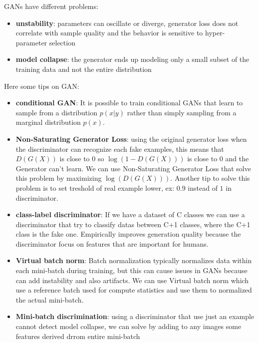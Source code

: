 GANs have different problems:
\begin{itemize}
    \item \textbf{unstability}: parameters can oscillate or diverge, generator
    loss does not correlate with sample quality and the behavior is sensitive to 
    hyper-parameter selection
    \item \textbf{model collapse}: the generator ends up modeling only a small
    subset of the training data and not the entire distribution
\end{itemize}

Here some tips on GAN:
\begin{itemize}
    \item \textbf{conditional GAN}: It is possible to train conditional GANs that learn 
    to sample from a distribution $p(x | y)$ rather than simply sampling from a 
    marginal distribution $p(x)$. 
    \item \textbf{Non-Saturating Generator Loss}: using the original generator loss 
    when the discriminator can recognize each fake examples, this means that 
    $D(G(X))$ is close to $0$ so $\log(1-D(G(X)))$ is close to 0 and the Generator
    can't learn. We can use Non-Saturating Generator Loss that solve this problem 
    by maximizing $\log(D(G(X)))$. Another tip to solve this problem is to set 
    treshold of real example lower, ex: $0.9$ instead of $1$ in discriminator. 
    \item \textbf{class-label discriminator}: If we have a dataset of C classes 
    we can use a discriminator that try to classify datas between C+1 classes, where 
    the C+1 class is the fake one. Empirically improves generation quality because 
    the discriminator focus on features that are important for humans.
    \item \textbf{Virtual batch norm}: Batch normalization typically normalizes 
    data within each mini-batch during training, but this can cause issues in GANs
    because can add instability and also artifacts. We can use Virtual batch norm
    which use a reference batch used for compute statistics and use them to normalized 
    the actual mini-batch.  
    \item \textbf{Mini-batch discrimination}: using a discriminator that use just 
    an example cannot detect model collapse, we can solve by adding to any images 
    some features derived drrom entire mini-batch
\end{itemize}



